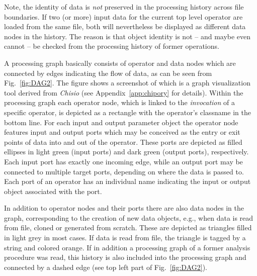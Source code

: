 Note, the identity of data is {\em not} preserved in the processing history
across file boundaries. If two (or more) input data for the current top
level operator are loaded
from the same file, both will nevertheless be displayed as different data
nodes in the history. The reason is that object identity is not -- and maybe even cannot -- be checked from the
processing history of former operations.

A processing graph basically consists of operator and data nodes which are connected by edges 
indicating the flow of data, as can be seen from Fig.~\ref{fig:DAG2}. 
The figure shows a screenshot of \mtbc which is a graph visualization tool derived from {\em Chisio}
(see Appendix~\ref{app:chipory} for details).
Within the processing graph each operator node, which is linked to the {\em invocation} of a specific operator,
is depicted as a rectangle with the operator's 
classname in the bottom line.
For each input and output parameter object the operator node features input and output ports which may be conceived as the entry or exit points of data into and out of the operator. These ports are depicted as filled ellipses in light green (input ports) and dark green (output ports),
respectively. Each input port has exactly one incoming edge, while an output
port may be connected to multiple target ports,
depending on where the data is passed to. 
Each port of an operator has an individual name indicating the input or output object associated
with the port. 

In addition to operator nodes and their ports there are also data nodes in the
graph, corresponding to the creation of new data objects, e.g., when data is read from
file, cloned or generated from scratch. These are depicted as triangles filled
in light grey in most cases.
If data is read from file, the triangle is tagged by a string
and colored orange.
If in addition
a processing graph of a
former analysis procedure was read, this history is also included into the
processing graph
and connected by a dashed edge (see top left part of Fig.~\ref{fig:DAG2}).


